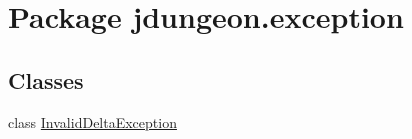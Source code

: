\hypertarget{namespacejdungeon_1_1exception}{
\section{Package jdungeon.exception}
\label{namespacejdungeon_1_1exception}
}
\subsection*{Classes}
\begin{DoxyCompactItemize}
\item 
class \hyperlink{classjdungeon_1_1exception_1_1_invalid_delta_exception}{InvalidDeltaException}
\end{DoxyCompactItemize}
